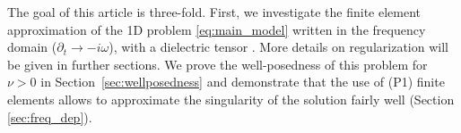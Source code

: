  





The goal of this article is three-fold. 
First, we investigate the finite element approximation of the 1D 
problem \eqref{eq:main_model} written in the frequency domain ($\partial_t\rightarrow -i\omega$), with a dielectric tensor . More details on regularization will be given in further sections. 
We prove the well-posedness of this problem for $\nu>0$ in Section~\ref{sec:wellposedness} and 
demonstrate that the use of  (P1) finite elements allows to approximate the singularity 
of the solution fairly well (Section \ref{sec:freq_dep}). 



